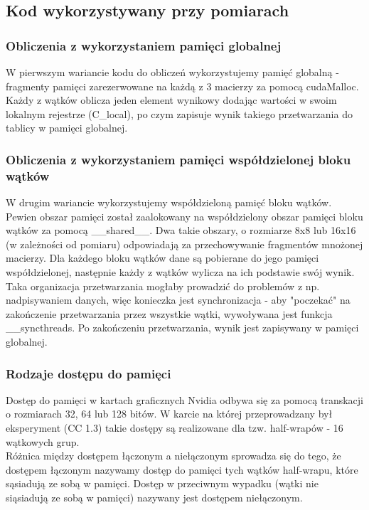 \documentclass[10pt,a4paper]{article}
\begin{document}
\subsection{Kod wykorzystywany przy pomiarach}
\subsubsection*{Obliczenia z wykorzystaniem pamięci globalnej}
W pierwszym wariancie kodu do obliczeń wykorzystujemy pamięć globalną - fragmenty
pamięci zarezerwowane na każdą z 3 macierzy za pomocą cudaMalloc. Każdy z wątków
oblicza jeden element wynikowy dodając wartości w swoim lokalnym rejestrze (C\_local),
po czym zapisuje wynik takiego przetwarzania do tablicy w pamięci globalnej.

\subsubsection*{Obliczenia z wykorzystaniem pamięci współdzielonej bloku wątków}
W drugim wariancie wykorzystujemy współdzieloną pamięć bloku wątków. Pewien obszar
pamięci został zaalokowany na współdzielony obszar pamięci bloku wątków za pomocą
\_\_shared\_\_. Dwa takie obszary, o rozmiarze 8x8 lub 16x16 (w zależności od pomiaru)
odpowiadają za przechowywanie fragmentów mnożonej macierzy. Dla każdego bloku wątków
dane są pobierane do jego pamięci współdzielonej, następnie każdy z wątków wylicza
na ich podstawie swój wynik. \\
Taka organizacja przetwarzania mogłaby prowadzić do problemów z np. nadpisywaniem danych,
więc konieczka jest synchronizacja - aby "poczekać" na zakończenie przetwarzania przez wszystkie wątki, wywoływana
jest funkcja \_\_syncthreads. Po zakończeniu przetwarzania, wynik jest zapisywany w
pamięci globalnej.


\subsubsection{Rodzaje dostępu do pamięci}
Dostęp do pamięci w kartach graficznych Nvidia odbywa się za pomocą transkacji o rozmiarach
32, 64 lub 128 bitów. W karcie na której przeprowadzany był eksperyment (CC 1.3) takie dostępy
są realizowane dla tzw. half-wrapów - 16 wątkowych grup. \\
Różnica między dostępem łączonym a niełączonym sprowadza się do tego, że
dostępem łączonym nazywamy dostęp do pamięci tych wątków half-wrapu, które
sąsiadują ze sobą w pamięci. Dostęp w przeciwnym wypadku (wątki nie siąsiadują ze sobą
w pamięci) nazywany jest dostępem niełączonym.
\end{document}
